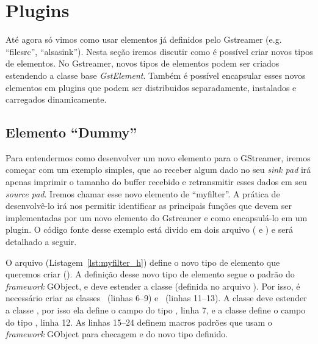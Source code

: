 \section{Plugins}
\label{sec:plugins}
Até agora só vimos como usar elementos já definidos pelo Gstreamer (e.g.
``filesrc'', ``alsasink'').  Nesta seção iremos discutir como é possível criar
novos tipos de elementos.  No Gstreamer, novos tipos de elementos podem ser
criados estendendo a classe base \emph{GstElement}.  Também é possível encapsular
esses novos elementos em plugins que podem ser distribuidos separadamente,
instalados e carregados dinamicamente. 



\subsection*{Elemento ``Dummy''}
Para entendermos como desenvolver um novo elemento para  o GStreamer, iremos
começar com um exemplo simples, que ao receber algum dado no seu \emph{sink
pad} irá apenas imprimir o tamanho do buffer recebido e retransmitir esses
dados em seu \emph{source pad}.  Iremos chamar esse novo elemento de
``myfilter''.  A prática de desenvolvê-lo irá nos permitir identificar as
principais funções que devem ser implementadas por um novo elemento do
Gstreamer e como encapsulá-lo em um plugin.  O código fonte desse exemplo está
divido em dois arquivo ( e ) e será detalhado a
seguir.

O arquivo  (Listagem~\ref{lst:myfilter_h}) define o novo tipo de
elemento que queremos criar ().  A definição desse novo tipo de
elemento segue o padrão do \emph{framework} GObject, e deve estender a classe
 (definida no arquivo ).  Por isso, é necessário
criar as classes ~(linhas 6--9) e ~(linhas
11--13).  A classe  deve estender a classe , por
isso ela define o campo  do tipo , linha 7, e a classe
 define o campo  do tipo
, linha 12.  As linhas 15--24 definem macros padrões que
usam o \emph{framework} GObject para checagem e  do novo tipo
definido.

